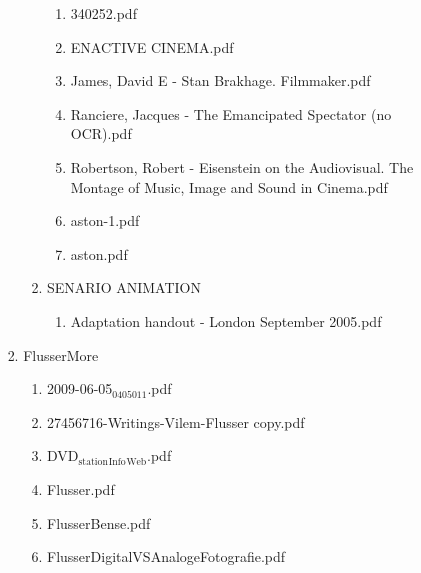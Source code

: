 \documentclass[11pt]{article}
\begin{document}
\begin{enumerate}
\begin{enumerate}
\begin{enumerate}
\begin{enumerate}
\begin{enumerate}
\begin{enumerate}
\item 340252.pdf
\label{sec-1-1-1-1-7-3-26-20-3}

\item ENACTIVE CINEMA.pdf
\label{sec-1-1-1-1-7-3-26-20-4}

\item James, David E - Stan Brakhage. Filmmaker.pdf
\label{sec-1-1-1-1-7-3-26-20-5}

\item Ranciere, Jacques - The Emancipated Spectator (no OCR).pdf
\label{sec-1-1-1-1-7-3-26-20-6}

\item Robertson, Robert - Eisenstein on the Audiovisual. The Montage of Music, Image and Sound in Cinema.pdf
\label{sec-1-1-1-1-7-3-26-20-7}

\item aston-1.pdf
\label{sec-1-1-1-1-7-3-26-20-8}

\item aston.pdf
\label{sec-1-1-1-1-7-3-26-20-9}
\end{enumerate}

\item SENARIO ANIMATION
\label{sec-1-1-1-1-7-3-26-21}
\begin{enumerate}
\item Adaptation handout - London September 2005.pdf
\label{sec-1-1-1-1-7-3-26-21-1}
\end{enumerate}
\end{enumerate}

\item FlusserMore
\label{sec-1-1-1-1-7-3-27}
\begin{enumerate}
\item 2009-06-05$_{\text{0405011}}$.pdf
\label{sec-1-1-1-1-7-3-27-1}

\item 27456716-Writings-Vilem-Flusser copy.pdf
\label{sec-1-1-1-1-7-3-27-2}

\item DVD$_{\text{station}}$$_{\text{Info}}$$_{\text{Web}}$.pdf
\label{sec-1-1-1-1-7-3-27-3}

\item Flusser.pdf
\label{sec-1-1-1-1-7-3-27-4}

\item FlusserBense.pdf
\label{sec-1-1-1-1-7-3-27-5}

\item FlusserDigitalVSAnalogeFotografie.pdf
\label{sec-1-1-1-1-7-3-27-6}


\end{enumerate}
\end{enumerate}
\end{enumerate}
\end{enumerate}
\end{enumerate}
\end{document}
